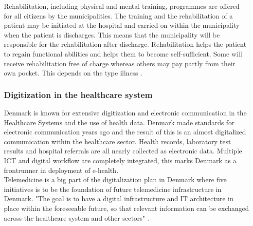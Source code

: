 Rehabilitation, including physical and mental training, programmes are offered for all citizens by the municipalities. The training and the rehabilitation of a patient may be initiated at the hospital and carried on within the municipality when the patient is discharges. This means that the municipality will be responsible for the rehabilitation after discharge. Rehabilitation helps the patient to regain functional abilities and helps them to become self-sufficient. Some will receive rehabilitation free of charge whereas others may pay partly from their own pocket. This depends on the type illness \cite{Healthcareindk2}.



\subsubsection{Digitization in the healthcare system}

Denmark is known for extensive digitization and electronic communication in the Healthcare Systems and the use of health data. Denmark made standards for electronic communication years ago and the result of this is an almost digitalized communication within the healthcare sector. Health records, laboratory test results and hospital referrals are all nearly collected as electronic data. 
Multiple ICT and digital workflow are completely integrated, this marks Denmark as a frontrunner in deployment of e-health.\\
Telemedicine is a big part of the digitalization plan in Denmark where five initiatives is to be the foundation of future telemedicine infrastructure in Denmark. "The goal is to have a digital infrastructure and IT architecture in place within the foreseeable future, so that relevant information can be exchanged across the healthcare system and other sectors" \cite{Healthcareindk2}.





